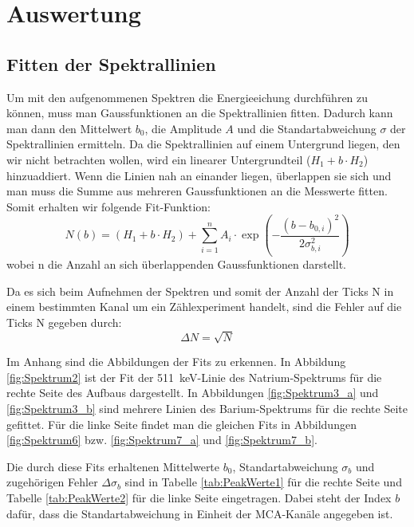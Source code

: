 \section{Auswertung}

\subsection{Fitten der Spektrallinien}

Um mit den aufgenommenen Spektren die Energieeichung durchführen zu können, muss man Gaussfunktionen an die Spektrallinien fitten.
Dadurch kann man dann den Mittelwert $b_0$, die Amplitude $A$ und die Standartabweichung $\sigma$ der Spektrallinien ermitteln.
Da die Spektrallinien auf einem Untergrund liegen, den wir nicht betrachten wollen, wird ein linearer Untergrundteil ($H_1 + b \cdot H_2$) hinzuaddiert.
Wenn die Linien nah an einander liegen, überlappen sie sich und man muss die Summe aus mehreren Gaussfunktionen an die Messwerte fitten.
Somit erhalten wir folgende Fit-Funktion:
\begin{equation}
    N(b) = (H_1 + b \cdot H_2) + \sum_{i=1}^{n} A_i \cdot \exp \left( - \frac{(b - b_{0,i})^2}{2 \sigma_{b,i}^2}\right)
    \label{eq:LinienFitFunktion}
\end{equation}
wobei n die Anzahl an sich überlappenden Gaussfunktionen darstellt.

Da es sich beim Aufnehmen der Spektren und somit der Anzahl der Ticks N in einem bestimmten Kanal um ein Zählexperiment handelt, sind die Fehler auf die Ticks N gegeben durch:
\begin{displaymath}
    \Delta N = \sqrt{N}
\end{displaymath}

Im Anhang sind die Abbildungen der Fits zu erkennen. 
In Abbildung \ref{fig:Spektrum2} ist der Fit der \SI{511}{\kilo\eV}-Linie des Natrium-Spektrums für die rechte Seite des Aufbaus dargestellt.
In Abbildungen \ref{fig:Spektrum3_a} und \ref{fig:Spektrum3_b} sind mehrere Linien des Barium-Spektrums für die rechte Seite gefittet.
Für die linke Seite findet man die gleichen Fits in Abbildungen \ref{fig:Spektrum6} bzw. \ref{fig:Spektrum7_a} und \ref{fig:Spektrum7_b}.

Die durch diese Fits erhaltenen Mittelwerte $b_0$, Standartabweichung $\sigma_b$ und zugehörigen Fehler $\Delta \sigma_b$ sind in Tabelle \ref{tab:PeakWerte1} für die rechte Seite und Tabelle \ref{tab:PeakWerte2} für die linke Seite eingetragen.
Dabei steht der Index $b$ dafür, dass die Standartabweichung in Einheit der MCA-Kanäle angegeben ist.

